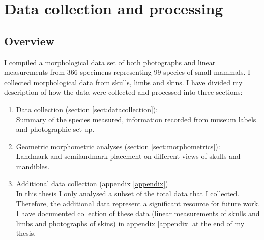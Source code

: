 
\chapter{Data collection and processing}
\label{chap:methods}

\section{Overview}

	I compiled a morphological data set of both photographs and linear measurements from 366 specimens representing 99 species of small mammals. 
	I collected morphological data from skulls, limbs and skins. I have divided my description of how the data were collected and processed into three sections:
	
	\begin{enumerate}[i]
	
	\item Data collection (section \ref{sect:datacollection}): \\
	Summary of the species measured, information recorded from museum labels and photographic set up.
	
	\item Geometric morphometric analyses (section \ref{sect:morphometrics}):\\
	Landmark and semilandmark placement on different views of skulls and mandibles.
	
	
	
	\item Additional data collection (appendix \ref{appendix}) \\
	In this thesis I only analysed a subset of the total data that I collected. Therefore, the additional data represent a significant resource for future work. I have documented collection of these data (linear measurements of skulls and limbs and photographs of skins) in appendix \ref{appendix} at the end of my thesis.
	
	\end{enumerate} 


